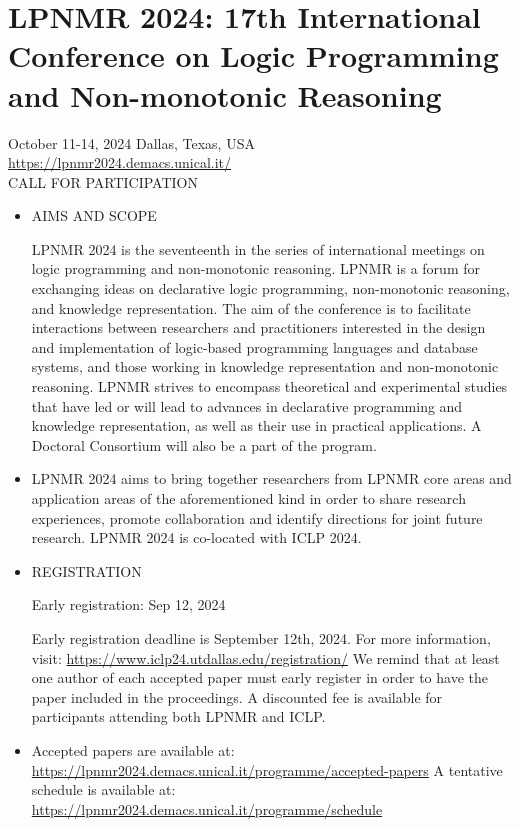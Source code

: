 \documentclass[prodmode,acmtecs]{acmsmall} %
\begin{document}
\section{LPNMR 2024: 17th International Conference on Logic Programming and Non-monotonic Reasoning}\label{LPNMR2024}  October 11-14, 2024 Dallas, Texas, USA \\ 
  \href{https://lpnmr2024.demacs.unical.it/}{https://lpnmr2024.demacs.unical.it/}\\ 
CALL FOR PARTICIPATION 

\begin{itemize}\item  AIMS AND SCOPE 
 
  LPNMR 2024 is the seventeenth in the series of international meetings on logic programming and non-monotonic reasoning. LPNMR is a forum for exchanging ideas on declarative logic programming, non-monotonic reasoning, and knowledge representation. The aim of the conference is to facilitate interactions between researchers and practitioners interested in the design and implementation of logic-based programming languages and database systems, and those working in knowledge representation and non-monotonic reasoning. LPNMR strives to encompass theoretical and experimental studies that have led or will lead to advances in declarative programming and knowledge representation, as well as their use in practical applications. A Doctoral Consortium will also be a part of the program. 
 
\item  LPNMR 2024 aims to bring together researchers from LPNMR core areas and application areas of  the aforementioned kind in order to share research experiences, promote collaboration and identify directions for joint future research. LPNMR 2024 is co-located with ICLP 2024. 
 
\item  REGISTRATION 
 
Early registration: Sep 12, 2024 
 
  Early registration deadline is September 12th, 2024. For more information, visit: \href{https://www.iclp24.utdallas.edu/registration/}{https://www.iclp24.utdallas.edu/registration/} We remind that at least one author of each accepted paper must early register in order to have the paper included in the proceedings. A discounted fee is available for participants attending both LPNMR and ICLP. 
 
\item  Accepted papers are available at: \href{https://lpnmr2024.demacs.unical.it/programme/accepted-papers}{https://lpnmr2024.demacs.unical.it/programme/accepted-papers} A tentative schedule is available at: \href{https://lpnmr2024.demacs.unical.it/programme/schedule}{https://lpnmr2024.demacs.unical.it/programme/schedule} 
 

\end{itemize}
\end{document}
